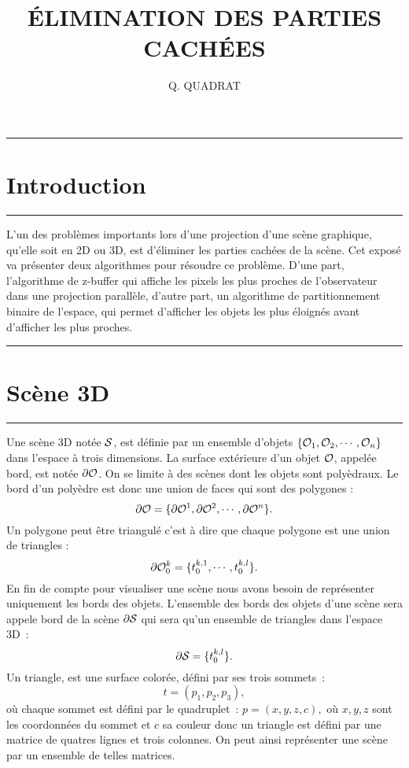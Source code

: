 \documentclass[a4paper,11pt]{amsart}
\begin{document}
\title{\'ELIMINATION DES PARTIES CACH\'EES} 
\author{Q. QUADRAT}

\maketitle \tableofcontents
\vfill \vspace{0.5cm}\hrule
\section{Introduction}
\hrule\vspace{0.5cm}

L'un des probl\`emes importants lors d'une projection d'une sc\`ene graphique, 
qu'elle soit en 2D ou 3D, est d'\'eliminer les parties cach\'ees 
de la sc\`ene.  Cet expos\'e va pr\'esenter deux 
algorithmes pour r\'esoudre ce probl\`eme.  
D'une part, l'algorithme de z-buffer 
qui affiche les pixels les plus proches de l'observateur dans une 
projection parall\`ele,
d'autre part, un algorithme de partitionnement binaire de 
l'espace, qui permet d'afficher les objets les plus \'eloign\'es 
avant d'afficher les plus proches.

\newpage
\vfill \vspace{0.5cm}\hrule
\section{Sc\`ene 3D}
\hrule\vspace{0.5cm}
Une sc\`ene 3D not\'ee ${\mathcal S}$, est d\'efinie par un ensemble d'objets 
$\{{\mathcal O}_1,{\mathcal O}_2,\cdots,{\mathcal O}_n \}$ dans l'espace \`a trois dimensions.  
La surface ext\'erieure d'un objet ${\mathcal O}$, appel\'ee bord, est not\'ee 
$\partial{\mathcal O}$.  On se limite \`a des sc\`enes dont les objets sont 
poly\`edraux.  Le bord d'un poly\`edre est donc une union de faces qui 
sont des polygones : $$\partial{\mathcal O}=\{\partial{\mathcal O}^1, 
\partial{\mathcal O}^2,\cdots, \partial{\mathcal O}^n\}.$$ Un polygone peut \^etre 
triangul\'e c'est \`a dire que chaque polygone est une union de 
triangles : $$\partial{\mathcal O}_0^k=\{t_0^{k,1},\cdots,t_0^{k,l}\}.$$ En fin 
de compte pour visualiser une sc\`ene nous avons besoin de 
repr\'esenter uniquement les bords des objets.  L'ensemble des bords des 
objets d'une sc\`ene sera appele bord de la sc\`ene $\partial{\mathcal S}$ qui 
sera qu'un ensemble de triangles dans l'espace 3D~: 
$$\partial{\mathcal S}=\{t_0^{k,l}\}.$$ Un triangle, est une surface 
color\'ee, 
d\'efini par ses trois sommets~: $$t=(p_1,p_2,p_3),$$ o\`u chaque 
sommet est d\'efini par le quadruplet~: $p=(x,y,z,c),$ o\`u $x,y,z$ 
sont les coordonn\'ees du sommet et $c$ sa couleur donc  un triangle est 
d\'efini par une matrice de quatres lignes et trois colonnes.  On peut 
ainsi repr\'esenter une sc\`ene par un ensemble de telles matrices.
\end{document}
